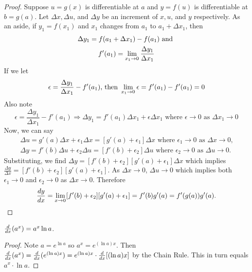 \documentclass[a4paper,11pt]{article}
\begin{document}
\begin{outline}
    \begin{proof}
      Suppose \(u=g(x)\) is differentiable at \(a\) and \(y=f(u)\) is differentiable at \(b=g(a)\). Let
      \(\Delta x, \Delta u\), and \(\Delta y\) be an increment of \(x, u\), and \(y\) respectively. As an aside,
      if \(y_1=f(x_1)\) and \(x_1\) changes from \(a_1\) to \(a_1 + \Delta x_1\), then 
      \begin{gather*}
        \Delta y_1 = f(a_1+\Delta x_1)-f(a_1)\text{ and }\\
        f'(a_1) = \xlimit{x_1}{0}\frac{\Delta y_1}{\Delta x_1}
      \end{gather*}
      If we let 
      \[
        \epsilon = \frac{\Delta y_1}{\Delta x_1} - f'(a_1)\text{, then }
        \xlimit{x_1}{0}\epsilon = f'(a_1)-f'(a_1) = 0
      \]
      Also note 
      \[
        \epsilon = \frac{\Delta y_1}{\Delta x_1} - f'(a_1) \Rightarrow \Delta y_1=f'(a_1)\Delta x_1 + 
        \epsilon\Delta x_1\text{ where } \epsilon \rightarrow 0\text{ as }\Delta x_1 \rightarrow 0
      \]
      Now, we can say
      \begin{gather*}
        \Delta u=g'(a)\Delta x + \epsilon_1\Delta x = [g'(a)+\epsilon_1]\Delta x\text{ where } \epsilon_1
          \rightarrow 0\text{ as }\Delta x\rightarrow 0\text{,}\\
        \Delta y=f'(b)\Delta u + \epsilon_2\Delta u = [f'(b)+\epsilon_2]\Delta u\text{ where } \epsilon_2 
          \rightarrow 0\text{ as }\Delta u\rightarrow 0\text{.}
      \end{gather*}
      Substituting, we find \(\Delta y=[f'(b)+\epsilon_2][g'(a)+\epsilon_1]\Delta x\) which implies
      \(\frac{\Delta y}{\Delta x} = [f'(b)+\epsilon_2][g'(a)+\epsilon_1]\). As \(\Delta x\rightarrow 0\), 
      \(\Delta u\rightarrow 0\) which implies both \(\epsilon_1\rightarrow 0\) and \(\epsilon_2\rightarrow 0\)
      as \(\Delta x\rightarrow 0\). 
      Therefore 
      \[
        \leibniz[y]{x} = \xlimit{x}{0}[f'(b)+\epsilon_2][g'(a)+\epsilon_1] = f'(b)g'(a) = f'(g(a))g'(a)\text{.}
      \]
    \end{proof}
  
    \(\leibniz{x}(a^x) = a^x\ln{a}\).
    
    \begin{proof}
      Note \(a = e^{\ln{a}}\) so \(a^x = e^{(\ln{a})x}\). Then \(\leibniz{x}(a^x) = \leibniz{x}(e^{(\ln{a})x})
      = e^{(\ln{a})x} \cdot \leibniz{x}[(\ln{a})x]\) by the Chain Rule. This in turn equals \(a^x\cdot \ln{a}\).
    \end{proof}
    

\end{outline}
\end{document}
